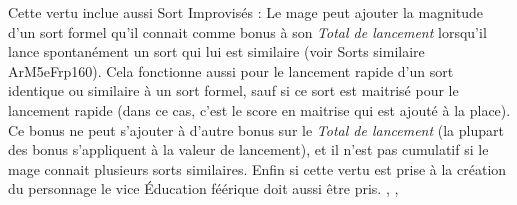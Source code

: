 {{Cette vertu inclue aussi Sort Improvisés :
Le mage peut ajouter la magnitude d'un sort formel qu'il connait comme bonus à son \emph{Total de lancement} lorsqu'il lance spontanément un sort qui lui est similaire (voir Sorts similaire ArM5eFrp160). Cela fonctionne aussi pour le lancement rapide d'un sort identique ou similaire à un sort formel, sauf si ce sort est maitrisé pour le lancement rapide (dans ce cas, c'est le score en maitrise qui est ajouté à la place). Ce bonus ne peut s'ajouter à d'autre bonus sur le \emph{Total de lancement} (la plupart des bonus s'appliquent à la valeur de lancement), et il n'est pas cumulatif si le mage connait plusieurs sorts similaires.
Enfin si cette vertu est prise à la création du personnage le vice Éducation féérique doit aussi être pris.
}\sep 
{}\sep
}
